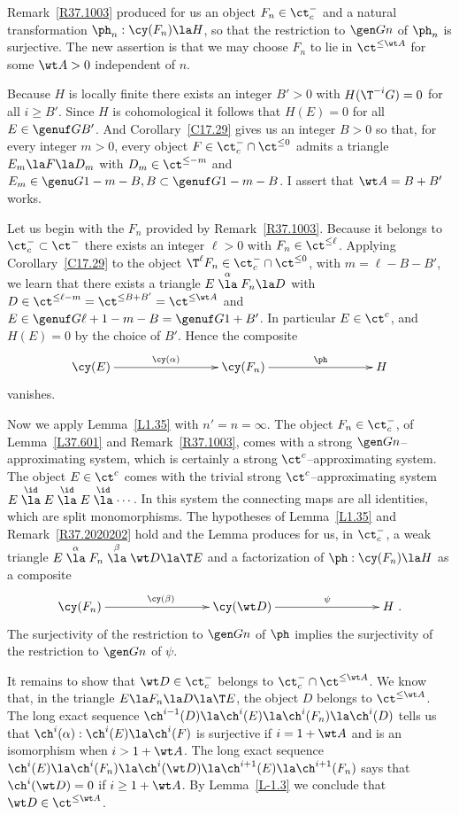 \documentclass[11pt]{amsart}
\begin{document}
\prf
Remark~\ref{R37.1003} produced for us an object $F_n\in\ct^-_c$
and
a natural transformation $\ph_n:\cy(F_n)\la H$,
so that the restriction to $\gen Gn$ of $\ph_n$ is surjective.
The new assertion is that we may choose $F_n$ to lie
in $\ct^{\leq\wt A}$ for some $\wt A>0$ independent of $n$.

Because $H$ is locally finite there exists an integer
$B'>0$ with $H(\T^{-i}G)=0$ for all $i\geq B'$. Since 
$H$ is cohomological it follows that $H(E)=0$ for all
$E\in\genuf G{}{B'}$. And Corollary~\ref{C17.29} gives us an
integer $B>0$ so that, for every integer $m>0$, every object
$F\in\ct^-_c\cap\ct^{\leq0}$ admits a triangle
$E_m\la F\la D_m$ with $D_m\in\ct^{\leq-m}$ and
$E_m\in\genu G{}{1-m-B,B}\subset\genuf G{}{1-m-B}$. I assert that
$\wt A=B+B'$ works.

Let us begin with the $F_n$ provided by
Remark~\ref{R37.1003}. Because it belongs to $\ct^-_c\subset\ct^-$
there exists an integer $\ell>0$ with $F_n\in\ct^{\leq\ell}$.
Applying Corollary~\ref{C17.29} to the object
$\T^\ell F_n\in\ct^-_c\cap\ct^{\leq0}$, with $m=\ell-B-B'$,
we learn that there exists a triangle $E\stackrel\alpha\la F_n\la D$ with
$D\in\ct^{\leq \ell-m}=\ct^{\leq B+B'}=\ct^{\leq\wt A}$ and
$E\in\genuf G{}{\ell+1-m-B}=\genuf G{}{1+B'}$.
In particular $E\in\ct^c$, and $H(E)=0$ by the choice of
$B'$. Hence
the composite 
\[\xymatrix@C+60pt{
  \cy(E)\ar[r]^-{\cy(\alpha)}  
  &\cy(F_n)\ar[r]^-{\ph} 
 & H
}\]
vanishes.

Now we apply Lemma~\ref{L1.35} with $n'=n=\infty$. The object
$F_n\in\ct^-_c$, of Lemma~\ref{L37.601} and Remark~\ref{R37.1003},
comes with a strong $\gen Gn$--approximating system, which
is certainly a strong $\ct^c$--approximating system.
The object $E\in\ct^c$ comes with the trivial strong
$\ct^c$--approximating system
$E\stackrel\id\la E\stackrel\id\la E\stackrel\id\la \cdots$. In this
system the connecting maps are all identities, which are
split monomorphisms. The hypotheses of Lemma~\ref{L1.35}
and Remark~\ref{R37.2020202} hold and
the Lemma produces for us, in $\ct^-_c$, a weak triangle 
$E\stackrel\alpha\la F_n\stackrel\beta\la \wt D\la \T E$
and a factorization of $\ph:\cy(F_n)\la H$
as a composite 
\[\xymatrix@C+60pt{
  \cy(F_n)\ar[r]^{\cy(\beta)}
  &\cy(\wt D)\ar[r]^-{\psi} 
 &H\ .
}\]
The surjectivity of the restriction to $\gen Gn$ of $\ph$ implies the
surjectivity of the restriction to $\gen Gn$ of $\psi$.

It remains to show that $\wt D\in\ct^-_c$ belongs to
$\ct^-_c\cap\ct^{\leq \wt A}$. We know that, in the triangle
$E\la F_n\la D\la \T E$, the object $D$ belongs to $\ct^{\leq\wt A}$.
The long exact
sequence $\ch^{i-1}(D)\la\ch^i(E)\la\ch^i(F_n)\la\ch^i(D)$
tells us that $\ch^i(\alpha):\ch^i(E)\la\ch^i(F)$
is surjective if $i=1+\wt A$ and is an isomorphism
when $i>1+\wt A$. The long exact sequence
$\ch^i(E)\la\ch^i(F_n)\la\ch^i(\wt D)\la\ch^{i+1}(E)\la\ch^{i+1}(F_n)$
says that $\ch^i(\wt D)=0$ if $i\geq 1+\wt A$. By Lemma~\ref{L-1.3}
we conclude that $\wt D\in\ct^{\leq\wt A}$.
\eprf
\end{document}
